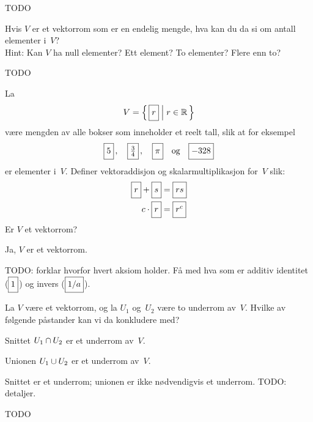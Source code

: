 \begin{losning}
TODO
\end{losning}


\begin{oppgave}
Hvis $V$ er et vektorrom som er en endelig mengde, hva kan du da si om
antall elementer i~$V$?
\\
Hint: Kan $V$ ha null elementer?  Ett element?  To elementer?  Flere
enn to?
\end{oppgave}

\begin{losning}
TODO
\end{losning}


\begin{oppgave}
La
\[
V = \left\{\, \boks{r} \;\middle|\; r \in \R \,\right\}
\]
være mengden av alle bokser som inneholder et reelt tall, slik at for
eksempel
\[
\boks{5}\,,\quad
\boks{\frac{3}{4}}\,,\quad
\boks{\pi}\quad\text{og}\quad
\boks{-328}
\]
er elementer i~$V$.  Definer vektoraddisjon og skalarmultiplikasjon
for~$V$ slik:
\begin{align*}
\boks{r} + \boks{s} &= \boks{rs} \\
c \cdot \boks{r}    &= \boks{r^c}
\end{align*}
Er $V$ et vektorrom?
\end{oppgave}

\begin{losning}
Ja, $V$ er et vektorrom.

TODO: forklar hvorfor hvert aksiom holder.  Få med hva som er additiv
identitet ($\boks{1}$) og invers ($\boks{1/a}$).
\end{losning}


\begin{oppgave}
La $V$ være et vektorrom, og la $U_1$ og~$U_2$ være to underrom
av~$V$.  Hvilke av følgende påstander kan vi da konkludere med?
\begin{punkt}
Snittet $U_1 \cap U_2$ er et underrom av~$V$.
\end{punkt}
\begin{punkt}
Unionen $U_1 \cup U_2$ er et underrom av~$V$.
\end{punkt}
\end{oppgave}

\begin{losning}
Snittet er et underrom; unionen er ikke nødvendigvis et underrom.
TODO: detaljer.
\end{losning}


\begin{oppgave}
\end{oppgave}

\begin{losning}
TODO
\end{losning}


